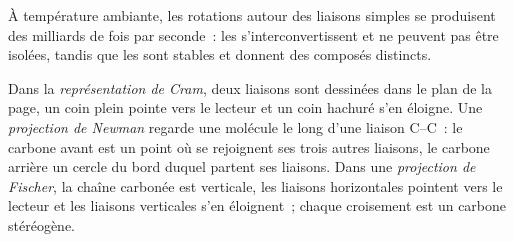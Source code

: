 À température ambiante, les rotations autour des liaisons simples se
produisent des milliards de fois par seconde~: les 
s'interconvertissent et ne peuvent pas être isolées, tandis que les
 sont stables et donnent des composés distincts.

\begin{definition}[Représentations]\label{def:b1:stereochemistry-in-depth:representations}
Dans la \emph{représentation de Cram}, deux liaisons
sont dessinées dans le plan de la page, un coin plein pointe vers le
lecteur et un coin hachuré s'en éloigne. Une \emph{projection de
Newman} regarde une molécule le long d'une
liaison C--C~: le carbone avant est un point où se rejoignent ses trois
autres liaisons, le carbone arrière un cercle du bord duquel partent ses
liaisons. Dans une \emph{projection de Fischer},
la chaîne carbonée est verticale, les liaisons horizontales pointent vers
le lecteur et les liaisons verticales s'en éloignent~; chaque croisement
est un carbone stéréogène.
\end{definition}

